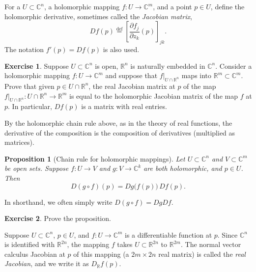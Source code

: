 \documentclass[12pt,openany]{book}
\newcommand{\C}{{\mathbb{C}}}
\newcommand{\R}{{\mathbb{R}}}
\newcommand{\myindex}[1]{#1\index{#1}}
\theoremstyle{plain}
\newtheorem{prop}[thm]{Proposition}
\theoremstyle{remark}
\theoremstyle{definition}
\newenvironment{exbox}{%
    \def\FrameCommand{\vrule width 1pt \relax\hspace{10pt}}%
    \MakeFramed{\advance\hsize-\width\FrameRestore}%
}{%
    \endMakeFramed
}
\theoremstyle{exercise}
\newtheorem{exercise}{Exercise}[section]
\theoremstyle{example}
\begin{document}
For a $U \subset \C^n$, a holomorphic mapping $f \colon U \to \C^m$,
and a point $p \in U$,
define the holomorphic derivative, sometimes called the
\emph{\myindex{Jacobian matrix}},
%
\begin{equation*}
Df(p)
\overset{\text{def}}{=}
\left[
\frac{\partial f_j}{\partial z_k} (p)
\right]_{jk} .
\end{equation*}
The notation $f'(p) = Df(p)$ is also used.

\begin{exbox}
\begin{exercise}
Suppose $U \subset \C^n$ is open, $\R^n$ is naturally embedded in $\C^n$.
Consider a holomorphic mapping $f \colon U \to \C^m$ and suppose that
$f|_{U \cap \R^n}$ maps into $\R^m \subset \C^m$.  Prove that given
$p \in U \cap \R^n$, the real
Jacobian matrix at $p$ of the map
$f|_{U \cap \R^n} \colon U \cap \R^n \to \R^m$ is equal to the holomorphic
Jacobian matrix of the map $f$ at $p$.  In particular, $Df(p)$ is a matrix
with real entries.
\end{exercise}
\end{exbox}

By the holomorphic chain rule above, as in the theory of real functions,
the derivative of the composition is the composition of derivatives
(multiplied as matrices).

\begin{prop}[Chain rule for holomorphic mappings]
Let $U \subset \C^n$ and $V \subset \C^m$ be open sets.  Suppose
$f \colon U \to V$ and $g \colon V \to \C^k$ are both holomorphic,
and $p \in U$.  Then
\begin{equation*}
D(g \circ f)(p) = Dg\bigl(f(p)\bigr) \, Df(p) .
\end{equation*}
\end{prop}

In shorthand, we often simply write $D(g \circ f) = Dg Df$.

\begin{exbox}
\begin{exercise}
Prove the proposition.
\end{exercise}
\end{exbox}

Suppose $U \subset \C^n$, $p \in U$, and $f \colon U \to \C^m$
is a differentiable function at $p$.
Since $\C^n$ is identified with $\R^{2n}$, the mapping $f$
takes $U \subset \R^{2n}$ to $\R^{2m}$.  The normal vector calculus Jacobian at $p$
of this mapping (a $2m \times 2n$ real matrix) is called the
\emph{\myindex{real Jacobian}}, and we write it as
%
$D_\R f (p)$.
\end{document}
